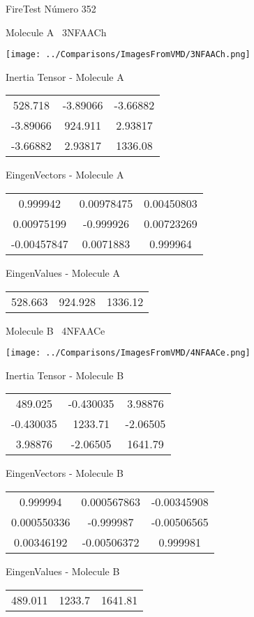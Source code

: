 \vtab[-3cm]
\begin{center}
{\large FireTest \tab Número 352}
\end{center}
\begin{multicols}{2}
\begin{center}

Molecule A \
3NFAACh

\texttt{[image: ../Comparisons/ImagesFromVMD/3NFAACh.png]}

Inertia Tensor - Molecule A \\
\begin{tabular}{|c c c|}
528.718	 & 	-3.89066	 & 	-3.66882	 \\
-3.89066	 & 	924.911	 & 	2.93817	 \\
-3.66882	 & 	2.93817	 & 	1336.08
\end{tabular}

\vtab
 EingenVectors - Molecule A     \\
\begin{tabular}{|c c c|}
0.999942	 & 	0.00978475	 & 	0.00450803	 \\
0.00975199	 & 	-0.999926	 & 	0.00723269	 \\
-0.00457847	 & 	0.0071883	 & 	0.999964
\end{tabular}

\vtab
 EingenValues - Molecule A     \\
\begin{tabular}{|c c c|}
528.663	 & 	924.928	 & 	1336.12	 \\
\end{tabular}
\columnbreak

Molecule B \
4NFAACe

\texttt{[image: ../Comparisons/ImagesFromVMD/4NFAACe.png]}

Inertia Tensor - Molecule B \\
\begin{tabular}{|c c c|}
489.025	 & 	-0.430035	 & 	3.98876	 \\
-0.430035	 & 	1233.71	 & 	-2.06505	 \\
3.98876	 & 	-2.06505	 & 	1641.79
\end{tabular}

\vtab
 EingenVectors - Molecule B     \\
\begin{tabular}{|c c c|}
0.999994	 & 	0.000567863	 & 	-0.00345908	 \\
0.000550336	 & 	-0.999987	 & 	-0.00506565	 \\
0.00346192	 & 	-0.00506372	 & 	0.999981
\end{tabular}

\vtab
 EingenValues - Molecule B     \\
\begin{tabular}{|c c c|}
489.011	 & 	1233.7	 & 	1641.81	 \\
\end{tabular}

\end{center}
\end{multicols}

